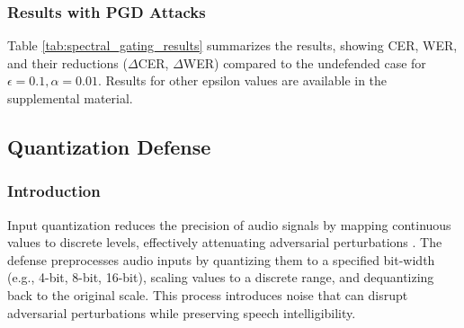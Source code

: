 \documentclass[a4paper,12pt]{article}
\begin{document}
\subsubsection{Results with PGD Attacks}



Table \ref{tab:spectral_gating_results} summarizes the results, showing CER, WER, and their reductions ($\Delta$CER, $\Delta$WER) compared to the undefended case for $\epsilon=0.1, \alpha=0.01$. Results for other epsilon values are available in the supplemental material.

\begin{table}[ht]
\caption{Spectral Gating Defense Results for $\epsilon=0.1, \alpha=0.01$}
\label{tab:spectral_gating_results}
\centering
{}
\end{table}




\subsection{Quantization Defense}
\subsubsection{Introduction}
Input quantization reduces the precision of audio signals by mapping continuous values to discrete levels, effectively attenuating adversarial perturbations \cite{li2024investigating}. The defense preprocesses audio inputs by quantizing them to a specified bit-width (e.g., 4-bit, 8-bit, 16-bit), scaling values to a discrete range, and dequantizing back to the original scale. This process introduces noise that can disrupt adversarial perturbations while preserving speech intelligibility.
\end{document}
